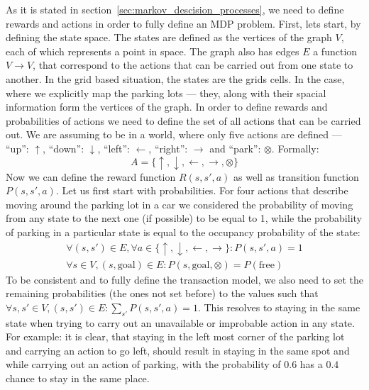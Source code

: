     As it is stated in section~\ref{sec:markov_descision_processes}, we need to define rewards and actions in order to fully define an MDP problem.
    First, lets start, by defining the state space. The states are defined as the vertices of the graph $V$, each of which represents a point in space. The graph also has edges $E$ a function $V \rightarrow V$, that correspond to the actions that can be carried out from one state to another. In the grid based situation, the states are the grids cells. In the case, where we explicitly map the parking lots --- they, along with their spacial information form the vertices of the graph.
    In order to define rewards and probabilities of actions we need to define the set of all actions that can be carried out. We are assuming to be in a world, where only five actions are defined --- ``up'': $\uparrow$,
    ``down'': $\downarrow$, ``left'': $\leftarrow$, ``right'': $\rightarrow$ and ``park'': $\otimes$. Formally:
    \begin{equation}
        A = \{ \uparrow, \downarrow, \leftarrow, \rightarrow, \otimes \}
    \end{equation}
    Now we can define the reward function $R(s, s', a)$ as well as transition function $P(s, s', a)$.
    Let us first start with probabilities. For four actions that describe moving around the parking lot in a car we considered the probability of moving from any state to the next one (if possible) to be equal to 1, while the probability of parking in a particular state is equal to the occupancy probability of the state:
    \begin{eqnarray}
        \forall (s, s') \in E, \forall a \in \{ \uparrow, \downarrow, \leftarrow, \rightarrow \} : P(s, s', a) = 1 \\
        \forall s \in V, (s,\mbox{goal}) \in E : P(s, \mbox{goal}, \otimes) = P(\mbox{free})
    \end{eqnarray}
    To be consistent and to fully define the transaction model, we also need to set the remaining probabilities (the ones not set before) to the values such that $\forall s, s' \in V, (s, s') \in E : \sum_{s'}P(s, s', a) = 1$.
    This resolves to staying in the same state when trying to carry out an unavailable or improbable action in any state. For example: it is clear, that staying in the left most corner of the parking lot and carrying an action to go left, should result in staying in the same spot and while carrying out an action of parking, with the probability of $0.6$ has a $0.4$ chance to stay in the same place.

